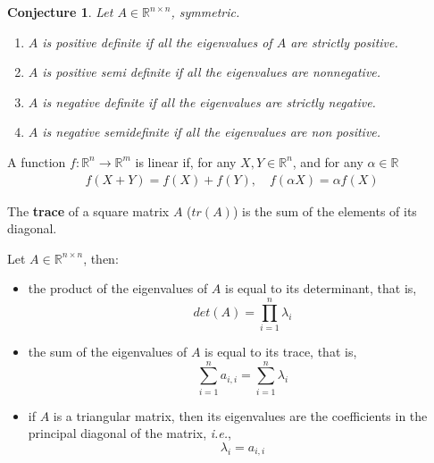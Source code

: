 \documentclass[aspectratio=169]{beamer}
\newtheorem{proposition}{Conjecture}[section]
\begin{document}
\begin{frame}
    \begin{proposition}
        Let $A\in\mathds{R}^{n\times n}$, symmetric.
        
        \begin{enumerate}
            \item $A$ is positive definite if all the eigenvalues of $A$ are strictly positive.
            \item $A$ is positive semi definite if all the eigenvalues are nonnegative.
            \item $A$ is negative definite if all the eigenvalues are strictly negative.
            \item $A$ is negative semidefinite if all the eigenvalues are non positive.
        \end{enumerate}
    \end{proposition}
\end{frame}

\begin{frame}
\begin{definition}
    A function $f:\mathds{R}^n\rightarrow\mathds{R}^m$ is linear if, for any $X,Y\in\mathds{R}^n$, and for any $\alpha\in\mathds{R}$
    \begin{align*}
        f(X+Y)=f(X)+f(Y),\quad f(\alpha X)=\alpha f(X)
    \end{align*}
\end{definition}
\end{frame}

\begin{frame}
    \begin{definition}
        The \textbf{trace} of a square matrix $A$ ($tr(A)$) is the sum of the elements of its diagonal.
    \end{definition}
\end{frame}

\begin{frame}
    \begin{theorem}
    Let $A\in\mathds{R}^{n\times n}$, then:
    \begin{itemize}
        \item the product of the eigenvalues of $A$ is equal to its determinant, that is,\[det(A)=\prod_{i=1}^n \lambda_i\]
        \item the sum of the eigenvalues of $A$ is equal to its trace, that is, \[\sum_{i=1}^n a_{i,i} =\sum_{i=1}^n \lambda_i\]
        \item if $A$ is a triangular matrix, then its eigenvalues are the coefficients in the principal diagonal of the matrix, \emph{i.e.}, \[\lambda_i = a_{i,i}\]
    \end{itemize}
    \end{theorem}
\end{frame}
\end{document}
